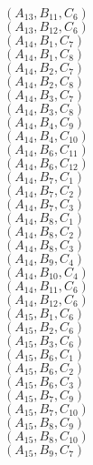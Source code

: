 \documentclass[14pt]{article}
\begin{document}
    $({A}_{13}, {B}_{11}, {C}_{6}) $ \\ 
    $({A}_{13}, {B}_{12}, {C}_{6}) $ \\ 
    $({A}_{14}, {B}_{1}, {C}_{7}) $ \\ 
    $({A}_{14}, {B}_{1}, {C}_{8}) $ \\ 
    $({A}_{14}, {B}_{2}, {C}_{7}) $ \\ 
    $({A}_{14}, {B}_{2}, {C}_{8}) $ \\ 
    $({A}_{14}, {B}_{3}, {C}_{7}) $ \\ 
    $({A}_{14}, {B}_{3}, {C}_{8}) $ \\ 
    $({A}_{14}, {B}_{4}, {C}_{9}) $ \\ 
    $({A}_{14}, {B}_{4}, {C}_{10}) $ \\ 
    $({A}_{14}, {B}_{6}, {C}_{11}) $ \\ 
    $({A}_{14}, {B}_{6}, {C}_{12}) $ \\ 
    $({A}_{14}, {B}_{7}, {C}_{1}) $ \\ 
    $({A}_{14}, {B}_{7}, {C}_{2}) $ \\ 
    $({A}_{14}, {B}_{7}, {C}_{3}) $ \\ 
    $({A}_{14}, {B}_{8}, {C}_{1}) $ \\ 
    $({A}_{14}, {B}_{8}, {C}_{2}) $ \\ 
    $({A}_{14}, {B}_{8}, {C}_{3}) $ \\ 
    $({A}_{14}, {B}_{9}, {C}_{4}) $ \\ 
    $({A}_{14}, {B}_{10}, {C}_{4}) $ \\ 
    $({A}_{14}, {B}_{11}, {C}_{6}) $ \\ 
    $({A}_{14}, {B}_{12}, {C}_{6}) $ \\ 
    $({A}_{15}, {B}_{1}, {C}_{6}) $ \\ 
    $({A}_{15}, {B}_{2}, {C}_{6}) $ \\ 
    $({A}_{15}, {B}_{3}, {C}_{6}) $ \\ 
    $({A}_{15}, {B}_{6}, {C}_{1}) $ \\ 
    $({A}_{15}, {B}_{6}, {C}_{2}) $ \\ 
    $({A}_{15}, {B}_{6}, {C}_{3}) $ \\ 
    $({A}_{15}, {B}_{7}, {C}_{9}) $ \\ 
    $({A}_{15}, {B}_{7}, {C}_{10}) $ \\ 
    $({A}_{15}, {B}_{8}, {C}_{9}) $ \\ 
    $({A}_{15}, {B}_{8}, {C}_{10}) $ \\ 
    $({A}_{15}, {B}_{9}, {C}_{7}) $ \\ 
\end{document}
